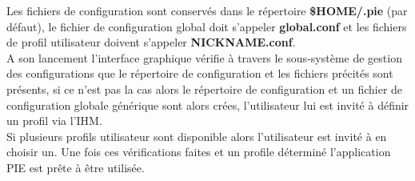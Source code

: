 Les fichiers de configuration sont conservés dans le répertoire \textbf{\$HOME/.pie} (par défaut), le fichier
de configuration global doit s'appeler \textbf{global.conf} et les fichiers de profil utilisateur doivent
s'appeler \textbf{NICKNAME.conf}. \\

A son lancement l'interface graphique vérifie à travers le sous-système de gestion des configurations
que le répertoire de configuration et les fichiers précités sont présents, si ce n'est pas la cas alors le
répertoire de configuration et un fichier de configuration globale générique sont alors crées, l'utilisateur lui
est invité à définir un profil via l'IHM. \\

Si plusieurs profils utilisateur sont disponible alors l'utilisateur est invité à en choisir un. Une fois ces
vérifications faites et un profile déterminé l'application PIE est prête à être utilisée.

